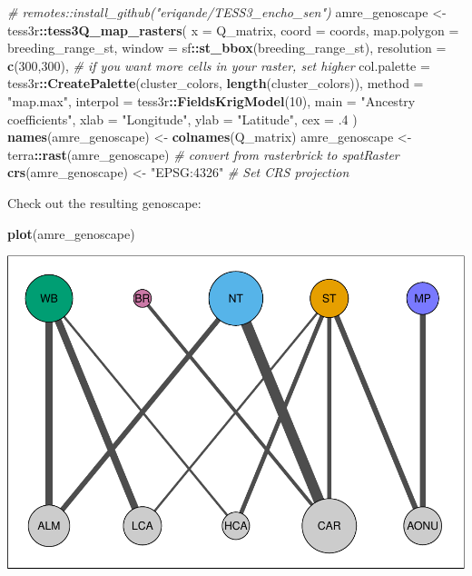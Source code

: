 \documentclass[
]{book}
\newenvironment{Shaded}{\begin{snugshade}}{\end{snugshade}}
\newcommand{\AttributeTok}[1]{\textcolor[rgb]{0.13,0.29,0.53}{#1}}
\newcommand{\CommentTok}[1]{\textcolor[rgb]{0.56,0.35,0.01}{\textit{#1}}}
\newcommand{\DecValTok}[1]{\textcolor[rgb]{0.00,0.00,0.81}{#1}}
\newcommand{\FunctionTok}[1]{\textcolor[rgb]{0.13,0.29,0.53}{\textbf{#1}}}
\newcommand{\NormalTok}[1]{#1}
\newcommand{\OtherTok}[1]{\textcolor[rgb]{0.56,0.35,0.01}{#1}}
\newcommand{\SpecialCharTok}[1]{\textcolor[rgb]{0.81,0.36,0.00}{\textbf{#1}}}
\newcommand{\StringTok}[1]{\textcolor[rgb]{0.31,0.60,0.02}{#1}}
\begin{document}
\begin{Shaded}
\begin{Highlighting}[]
\CommentTok{\# remotes::install\_github("eriqande/TESS3\_encho\_sen")}
\NormalTok{amre\_genoscape }\OtherTok{\textless{}{-}}\NormalTok{ tess3r}\SpecialCharTok{::}\FunctionTok{tess3Q\_map\_rasters}\NormalTok{(}
  \AttributeTok{x =}\NormalTok{ Q\_matrix,}
  \AttributeTok{coord =}\NormalTok{ coords,}
  \AttributeTok{map.polygon =}\NormalTok{ breeding\_range\_st,}
  \AttributeTok{window =}\NormalTok{ sf}\SpecialCharTok{::}\FunctionTok{st\_bbox}\NormalTok{(breeding\_range\_st),}
  \AttributeTok{resolution =} \FunctionTok{c}\NormalTok{(}\DecValTok{300}\NormalTok{,}\DecValTok{300}\NormalTok{), }\CommentTok{\# if you want more cells in your raster, set higher}
  \AttributeTok{col.palette =}\NormalTok{ tess3r}\SpecialCharTok{::}\FunctionTok{CreatePalette}\NormalTok{(cluster\_colors, }\FunctionTok{length}\NormalTok{(cluster\_colors)), }
  \AttributeTok{method =} \StringTok{"map.max"}\NormalTok{, }
  \AttributeTok{interpol =}\NormalTok{ tess3r}\SpecialCharTok{::}\FunctionTok{FieldsKrigModel}\NormalTok{(}\DecValTok{10}\NormalTok{),  }
  \AttributeTok{main =} \StringTok{"Ancestry coefficients"}\NormalTok{,}
  \AttributeTok{xlab =} \StringTok{"Longitude"}\NormalTok{, }
  \AttributeTok{ylab =} \StringTok{"Latitude"}\NormalTok{, }
  \AttributeTok{cex =}\NormalTok{ .}\DecValTok{4}
\NormalTok{)}
\FunctionTok{names}\NormalTok{(amre\_genoscape) }\OtherTok{\textless{}{-}} \FunctionTok{colnames}\NormalTok{(Q\_matrix)}
\NormalTok{amre\_genoscape }\OtherTok{\textless{}{-}}\NormalTok{ terra}\SpecialCharTok{::}\FunctionTok{rast}\NormalTok{(amre\_genoscape) }\CommentTok{\# convert from rasterbrick to spatRaster}
\FunctionTok{crs}\NormalTok{(amre\_genoscape) }\OtherTok{\textless{}{-}} \StringTok{"EPSG:4326"} \CommentTok{\# Set CRS projection}
\end{Highlighting}
\end{Shaded}

Check out the resulting genoscape:

\begin{Shaded}
\begin{Highlighting}[]
\FunctionTok{plot}\NormalTok{(amre\_genoscape)}
\end{Highlighting}
\end{Shaded}

\includegraphics{Mignette_files/figure-latex/unnamed-chunk-7-1.pdf}
\end{document}
